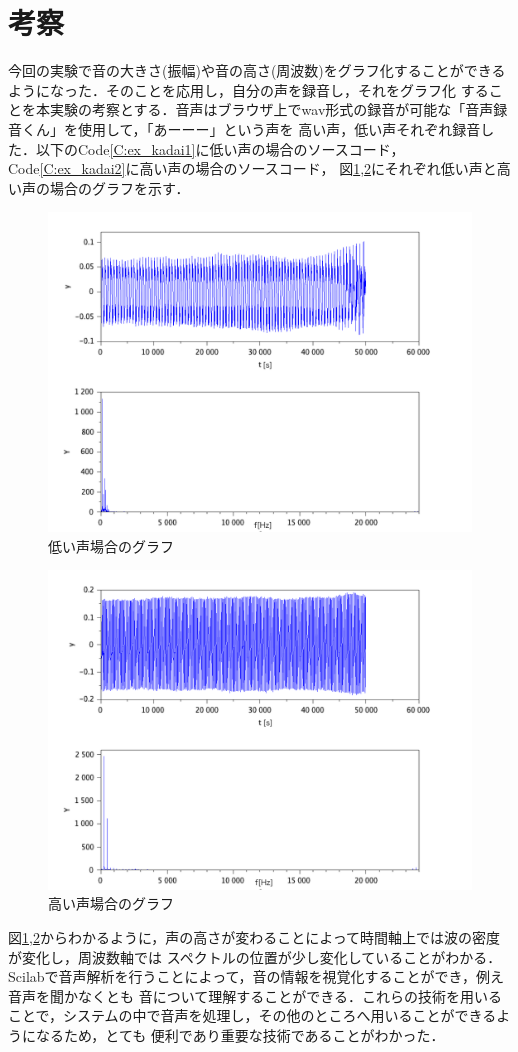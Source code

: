 \documentclass[a4paper,11pt]{jsarticle}
\begin{document}
\section{考察}
今回の実験で音の大きさ(振幅)や音の高さ(周波数)をグラフ化することができるようになった．そのことを応用し，自分の声を録音し，それをグラフ化
することを本実験の考察とする．音声はブラウザ上でwav形式の録音が可能な「音声録音くん」\cite{record}を使用して，「あーーー」という声を
高い声，低い声それぞれ録音した．以下のCode\ref{C:ex_kadai1}に低い声の場合のソースコード，Code\ref{C:ex_kadai2}に高い声の場合のソースコード，
図\ref{G:ex_kadai1},\ref{G:ex_kadai2}にそれぞれ低い声と高い声の場合のグラフを示す．

\begin{figure}[H]
  \centering
  \includegraphics[width=0.8\linewidth]{picture/ex_kadai1.png}
  \caption{低い声場合のグラフ}
  \label{G:ex_kadai1}
\end{figure}

\begin{figure}[H]
  \centering
  \includegraphics[width=0.8\linewidth]{picture/ex_kadai2.png}
  \caption{高い声場合のグラフ}
  \label{G:ex_kadai2}
\end{figure}
図\ref{G:ex_kadai1},\ref{G:ex_kadai2}からわかるように，声の高さが変わることによって時間軸上では波の密度が変化し，周波数軸では
スペクトルの位置が少し変化していることがわかる．Scilabで音声解析を行うことによって，音の情報を視覚化することができ，例え音声を聞かなくとも
音について理解することができる．これらの技術を用いることで，システムの中で音声を処理し，その他のところへ用いることができるようになるため，とても
便利であり重要な技術であることがわかった．
\end{document}

